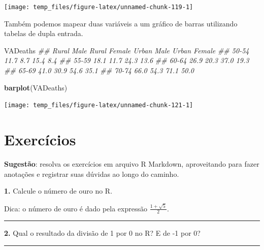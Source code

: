 \documentclass[]{book}
\newenvironment{Shaded}{\begin{snugshade}}{\end{snugshade}}
\newcommand{\CommentTok}[1]{\textcolor[rgb]{0.56,0.35,0.01}{\textit{#1}}}
\newcommand{\KeywordTok}[1]{\textcolor[rgb]{0.13,0.29,0.53}{\textbf{#1}}}
\newcommand{\NormalTok}[1]{#1}
\begin{document}
\begin{center}\texttt{[image: temp\_files/figure-latex/unnamed-chunk-119-1]} \end{center}

Também podemos mapear duas variáveis a um gráfico de barras utilizando tabelas de dupla entrada.

\begin{Shaded}
\begin{Highlighting}[]
\NormalTok{VADeaths}
\CommentTok{##       Rural Male Rural Female Urban Male Urban Female}
\CommentTok{## 50-54       11.7          8.7       15.4          8.4}
\CommentTok{## 55-59       18.1         11.7       24.3         13.6}
\CommentTok{## 60-64       26.9         20.3       37.0         19.3}
\CommentTok{## 65-69       41.0         30.9       54.6         35.1}
\CommentTok{## 70-74       66.0         54.3       71.1         50.0}
\end{Highlighting}
\end{Shaded}

\begin{Shaded}
\begin{Highlighting}[]
\KeywordTok{barplot}\NormalTok{(VADeaths)}
\end{Highlighting}
\end{Shaded}

\begin{center}\texttt{[image: temp\_files/figure-latex/unnamed-chunk-121-1]} \end{center}

\hypertarget{exercuxedcios}{%
\section{Exercícios}\label{exercuxedcios}}

\textbf{Sugestão}: resolva os exercícios em arquivo R Markdown, aproveitando para fazer anotações e registrar suas dúvidas ao longo do caminho.

\textbf{1.} Calcule o número de ouro no R.

Dica: o número de ouro é dado pela expressão \(\frac{1 + \sqrt{5}}{2}\).

\begin{center}\rule{0.5\linewidth}{0.5pt}\end{center}

\textbf{2.} Qual o resultado da divisão de 1 por 0 no R? E de -1 por 0?

\begin{center}\rule{0.5\linewidth}{0.5pt}\end{center}
\end{document}
